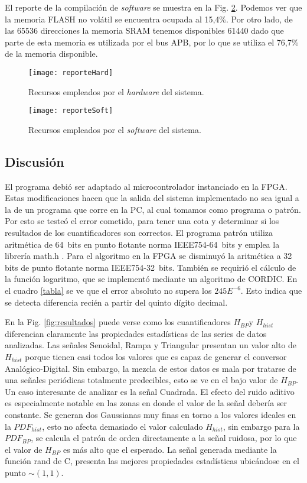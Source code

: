 El reporte de la compilación de \textit{software} se muestra en la Fig. \ref{fig:soft}.
Podemos ver que la memoria FLASH no volátil se encuentra ocupada al 15,4\%.
Por otro lado, de las 65536 direcciones la memoria SRAM tenemos disponibles 61440 dado que parte de esta memoria es utilizada por el bus APB, por lo que se utiliza el 76,7\% de la memoria disponible.

\begin{figure}[htb]
	\centering\texttt{[image: reporteHard]}
	\caption{Recursos empleados por el \textit{hardware} del sistema.}\label{fig:hard}
\end{figure}

\begin{figure}[htb]
	\centering\texttt{[image: reporteSoft]}
	\caption{Recursos empleados por el \textit{software} del sistema.}\label{fig:soft}
\end{figure}

\subsection{Discusión}
\label{sec:discusion}

El programa debió ser adaptado al microcontrolador instanciado en la FPGA.
Estas modificaciones hacen que la salida del sistema implementado no sea igual a la de un programa que corre en la PC, al cual tomamos como programa o patrón.
Por esto se testeó el error cometido, para tener una cota y determinar si los resultados de los cuantificadores son correctos.
El programa patrón utiliza aritmética de 64~bits en punto flotante norma IEEE754-64~bits y emplea la librería math.h \cite{Mathe}.
Para el algoritmo en la FPGA se disminuyó la aritmética a 32 bits de punto flotante norma IEEE754-32~bits.
También se requirió el cálculo de la función logaritmo, que se implementó mediante un algoritmo de CORDIC.
En el cuadro \ref{tabla} se ve que el error absoluto no supera los $245E^{-6}$. Esto indica que se detecta diferencia recién a partir del quinto dígito decimal.

En la Fig. \ref{fig:resultados} puede verse como los cuantificadores $H_{BP}$y $H_{hist}$ diferencian claramente las propiedades estadísticas de las series de datos analizadas.
Las señales Senoidal, Rampa y Triangular presentan un valor alto de $H_{hist}$ porque tienen casi todos los valores que es capaz de generar el conversor Analógico-Digital.
Sin embargo, la mezcla de estos datos es mala por tratarse de una señales periódicas totalmente predecibles, esto se ve en el bajo valor de $H_{BP}$.
Un caso interesante de analizar es la señal Cuadrada.
El efecto del ruido aditivo es especialmente notable en las zonas en donde el valor de la señal debería ser constante.
Se generan dos Gaussianas muy finas en torno a los valores ideales en la $PDF_{hist}$, esto no afecta demasiado el valor calculado $H_{hist}$, sin embargo para la $PDF_{BP}$, se calcula el patrón de orden directamente a la señal ruidosa, por lo que el valor de $H_{BP}$ es más alto que el esperado.
La señal generada mediante la función rand de C, presenta las mejores propiedades estadísticas ubicándose en el punto $\sim(1,1)$.

